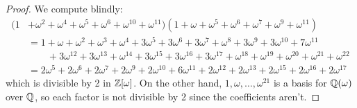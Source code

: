 \begin{proof}
    We compute blindly:
    \begin{align*}
    (1&+\omega^2+\omega^4+\omega^5+\omega^6+\omega^{10}+\omega^{11})(1+\omega+\omega^5+\omega^6+\omega^7+\omega^9+\omega^{11}) \\
        &= 1+\omega+\omega^2+\omega^3+\omega^4+3\omega^5+3\omega^6+3\omega^7+\omega^8+3\omega^9+3\omega^{10}+7\omega^{11} \\
        &\hspace{2em} +3\omega^{12}+3\omega^{13}+\omega^{14}+3\omega^{15}+3\omega^{16}+3\omega^{17}+\omega^{18}+\omega^{19}+\omega^{20}+\omega^{21}+\omega^{22} \\
        &= 2\omega^5+2\omega^6+2\omega^7+2\omega^9+2\omega^{10}+6\omega^{11}+2\omega^{12}+2\omega^{13}+2\omega^{15}+2\omega^{16}+2\omega^{17}
    \end{align*}
    which is divisible by 2 in $\mathbb{Z}[\omega]$. On the other hand, $1,\omega,\ldots,\omega^{21}$ is a basis for $\mathbb{Q}(\omega)$ over $\mathbb{Q}$, so each factor is not divisible by 2 since the coefficients aren't.
\end{proof}